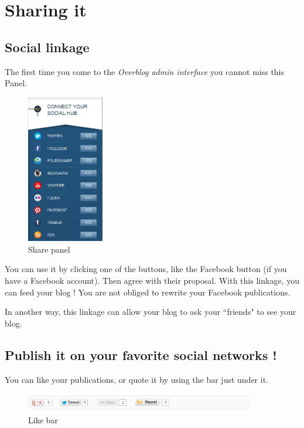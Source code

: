 \documentclass[a4paper,10pt]{article}
\begin{document}
\newpage
\section{Sharing it}

\subsection{Social linkage}

The first time you come to the  \emph{Overblog admin interface} you cannot miss this Panel.
\begin{figure}[h]
    \center
  \includegraphics[width=0.3\textwidth]{Images/shareIni.png}
    \caption{Share panel}
\end{figure}

You can use it by clicking one of the buttons, like the Facebook button (if you have a Facebook account). Then agree with their proposal. With this linkage, you can feed your blog ! You are not obliged to rewrite your Facebook publications.

In another way, this linkage can allow your blog to ask your ``friends" to see your blog.

\subsection{Publish it on your favorite social networks !}

You can like your publications, or quote it by using the bar just under it.

\begin{figure}[h]
    \center
  \includegraphics[width=0.9\textwidth]{Images/articleBar.png}
    \caption{Like bar}
\end{figure}
\end{document}
